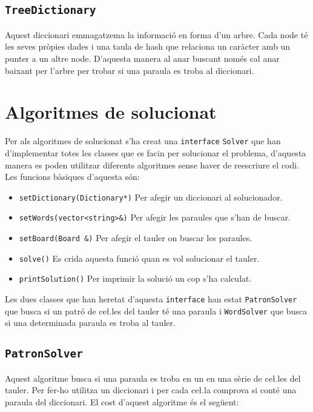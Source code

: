 \documentclass{article}
\begin{document}
\subsection{\texttt{TreeDictionary}}
Aquest diccionari emmagatzema la informació en forma d'un arbre. Cada node té les seves pròpies dades i una taula de hash que relaciona un caràcter amb un punter a un altre node. D'aquesta manera al anar buscant només cal anar baixant per l'arbre per trobar si una paraula es troba al diccionari.

\section{Algoritmes de solucionat}

Per als algoritmes de solucionat s'ha creat una \verb|interface| \verb|Solver| que han d'implementar totes les classes que es facin per solucionar el problema, d'aquesta manera es poden utilitzar diferents algoritmes sense haver de reescriure el codi. Les funcions bàsiques d'aquesta són:

\begin{itemize}
	\item \verb|setDictionary(Dictionary*)| Per afegir un diccionari al solucionador.
	\item \verb|setWords(vector<string>&)| Per afegir les paraules que s'han de buscar.
	\item \verb|setBoard(Board &)| Per afegir el tauler on buscar les paraules.
	\item \verb|solve()| Es crida aquesta funció quan es vol solucionar el tauler.
	\item \verb|printSolution()| Per imprimir la solució un cop s'ha calculat.
\end{itemize}

Les dues classes que han heretat d'aquesta \verb|interface| han estat \verb|PatronSolver| que busca si un patró de ce\l.les del tauler té una paraula i \verb|WordSolver| que busca si una determinada paraula es troba al tauler.

\subsection{\texttt{PatronSolver}}
Aquest algoritme busca si una paraula es troba en un en una sèrie de ce\l.les del tauler. Per fer-ho utilitza un diccionari i per cada ce\l.la comprova si conté una paraula del diccionari. El cost d'aquest algoritme és el següent:

\[  \]
\end{document}
